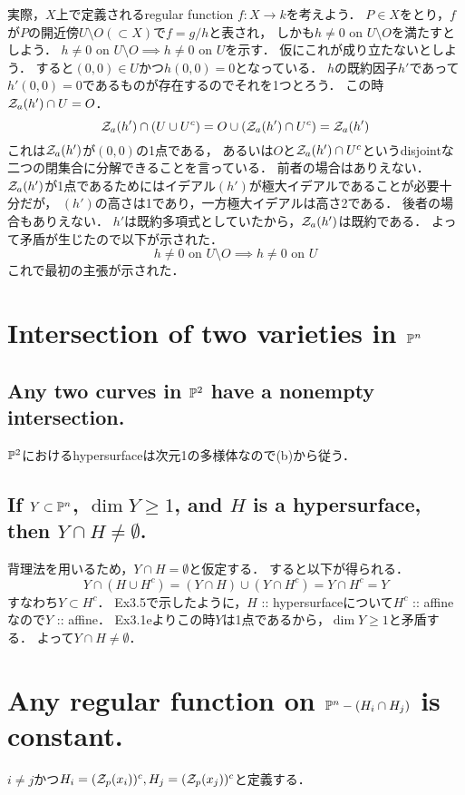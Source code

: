 \documentclass[a4paper]{jarticle}
\begin{document}
    実際，$ X$上で定義されるregular function $f:X \to k$を考えよう．
    $P \in X$をとり，$f$が$P$の開近傍$U \setminus O (\subset X)$で$f=g/h$と表され，
    しかも$h \neq 0 \mbox{ on } U \setminus O$を満たすとしよう．
    $h \neq 0 \mbox{ on } U \setminus O \implies h \neq 0 \mbox{ on } U$を示す．
    仮にこれが成り立たないとしよう．
    すると$(0,0) \in U$かつ$h(0,0)=0$となっている．
    $h$の既約因子$h'$であって$h'(0,0)=0$であるものが存在するのでそれを1つとろう．
    この時$\mathcal{Z}_a(h') \cap U=O$．
    \[ \mathcal{Z}_a(h') \cap (U \cup U^c)=O \cup (\mathcal{Z}_a(h') \cap U^c)=\mathcal{Z}_a(h') \]
    これは$\mathcal{Z}_a(h')$が$(0,0)$の1点である，
    あるいは$O$と$\mathcal{Z}_a(h') \cap U^c$というdisjointな二つの閉集合に分解できることを言っている．
    前者の場合はありえない．
    $\mathcal{Z}_a(h')$が1点であるためにはイデアル$(h')$が極大イデアルであることが必要十分だが，
    $(h')$の高さは1であり，一方極大イデアルは高さ2である．
    後者の場合もありえない．
    $h'$は既約多項式としていたから，$\mathcal{Z}_a(h')$は既約である．
    よって矛盾が生じたので以下が示された．
    \[ h \neq 0 \mbox{ on } U \setminus O \implies h \neq 0 \mbox{ on } U \]
    これで最初の主張が示された．

\section{Intersection of two varieties in $\mathbb{P}^n$} 
    \subsection{Any two curves in $\mathbb{P}^2$ have a nonempty intersection.}
    $\mathbb{P}^2$におけるhypersurfaceは次元1の多様体なので(b)から従う．

    \subsection{If $Y \subset \mathbb{P}^n$, $\dim Y \geq 1$, and $H$ is a hypersurface, then $Y \cap H \neq \emptyset$.}
    背理法を用いるため，$Y \cap H=\emptyset$と仮定する．
    すると以下が得られる．
    \[ Y \cap (H \cup H^c)=(Y \cap H) \cup (Y \cap H^c)=Y \cap H^c=Y \]
    すなわち$Y \subset H^c$．
    Ex3.5で示したように，$H$ :: hypersurfaceについて$H^c$ :: affineなので$Y$ :: affine．
    Ex3.1eよりこの時$Y$は1点であるから，$\dim Y \geq 1$と矛盾する．
    よって$Y \cap H \neq \emptyset$．

\section{Any regular function on $\mathbb{P}^n - (H_i \cap H_j)$ is constant.} 
    $i \neq j$かつ$H_i=(\mathcal{Z}_p(x_i))^c, H_j=(\mathcal{Z}_p(x_j))^c$と定義する．
\end{document}
